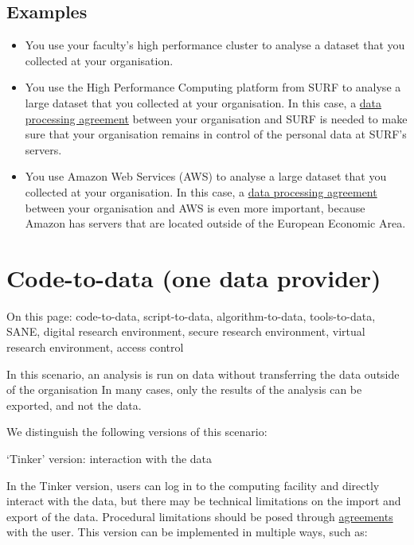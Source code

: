 \documentclass[
]{book}
\providecommand{\tightlist}{%
  \setlength{\itemsep}{0pt}\setlength{\parskip}{0pt}}
\begin{document}
\hypertarget{examples}{%
\subsection{Examples}\label{examples}}

\begin{itemize}
\tightlist
\item
  You use your faculty's high performance cluster to analyse a dataset that you
  collected at your organisation.
\item
  You use the High Performance Computing platform from SURF to analyse a large
  dataset that you collected at your organisation. In this case, a
  \protect\hyperlink{data-processing-agreement}{data processing agreement} between your organisation
  and SURF is needed to make sure that your organisation remains in control of the
  personal data at SURF's servers.
\item
  You use Amazon Web Services (AWS) to analyse a large dataset that you
  collected at your organisation. In this case, a
  \protect\hyperlink{data-processing-agreement}{data processing agreement} between your organisation
  and AWS is even more important, because Amazon has servers that are located
  outside of the European Economic Area.
\end{itemize}

\hypertarget{code-to-data}{%
\section{Code-to-data (one data provider)}\label{code-to-data}}

On this page: code-to-data, script-to-data, algorithm-to-data, tools-to-data,
SANE, digital research environment, secure research environment, virtual
research environment, access control

In this scenario, an analysis is run on data without transferring the data
outside of the organisation In many cases, only the results of the analysis
can be exported, and not the data.

We distinguish the following versions of this scenario:

`Tinker' version: interaction with the data

In the Tinker version, users can log in to the computing facility and directly
interact with the data, but there may be technical limitations on the import and
export of the data. Procedural limitations should be posed through
\protect\hyperlink{agreements}{agreements} with the user. This version can be implemented in
multiple ways, such as:
\end{document}
